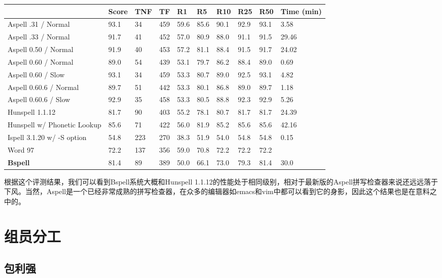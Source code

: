 \documentclass[UTF8,a4paper]{ctexart}
\begin{document}
\begin{table}[hbp]
\centering
    \begin{tabular}{|l|l|l|l|l|l|l|l|l|l|}
    \hline
		~ & Score & TNF & TF & R1 & R5 & R10 & R25 & R50 & Time (min) \\
		\hline
		Aspell .31 / Normal & 93.1 &34 & 459 &59.6 & 85.6 & 90.1 & 92.9 & 93.1 & 3.58 \\
		\hline
		Aspell .33 / Normal		&91.7	&41			&452		&57.0	&80.9	&88.0	&91.1	&91.5 & 29.46 \\
		\hline
		Aspell 0.50 / Normal		&91.9	&40			&453		&57.2	&81.1	&88.4	&91.5	&91.7 & 24.02 \\
		\hline
		Aspell 0.60 / Normal		&89.0	&54			&439		&53.1	&79.7	&86.2	&88.4	&89.0 & 0.69 \\
		\hline
		Aspell 0.60 / Slow		&93.1	&34			&459		&53.3	&80.7	&89.0	&92.5	&93.1 & 4.82 \\
		\hline
		Aspell 0.60.6 / Normal		&89.7	&51			&442		&53.3	&80.1	&86.8	&89.0	&89.7 & 1.18 \\
		\hline
		Aspell 0.60.6 / Slow		&92.9	&35			&458		&53.3	&80.5	&88.8	&92.3	&92.9 & 5.26 \\
		\hline
		Hunspell 1.1.12			&81.7	&90			&403		&55.2	&78.1	&80.7	&81.7	&81.7 & 24.39 \\
		\hline
		Hunspell w/ Phonetic Lookup	&85.6	&71			&422		&56.0	&81.9	&85.2	&85.6	&85.6 & 42.16 \\
		\hline
		Ispell 3.1.20 w/ -S option	&54.8	&223			&270		&38.3	&51.9	&54.0	&54.8	&54.8 & 0.15 \\
		\hline
		Word 97				&72.2	&137			&356		&59.0	&70.8	&72.2	&72.2	&72.2  & ~ \\
		\hline
		\textbf{Bspell}	 &	81.4 & 89 & 389 & 50.0 & 66.1 & 73.0 & 79.3 & 81.4 & 30.0 \\
		\hline
    \end{tabular}
\end{table}

根据这个评测结果，我们可以看到Bspell系统大概和Hunspell 1.1.12的性能处于相同级别，相对于最新版的Aspell拼写检查器来说还远远落于下风。当然，Aspell是一个已经非常成熟的拼写检查器，在众多的编辑器如emacs和vim中都可以看到它的身影，因此这个结果也是在意料之中的。

\section{组员分工}

\subsection{包利强}



\clearpage


\end{document}
